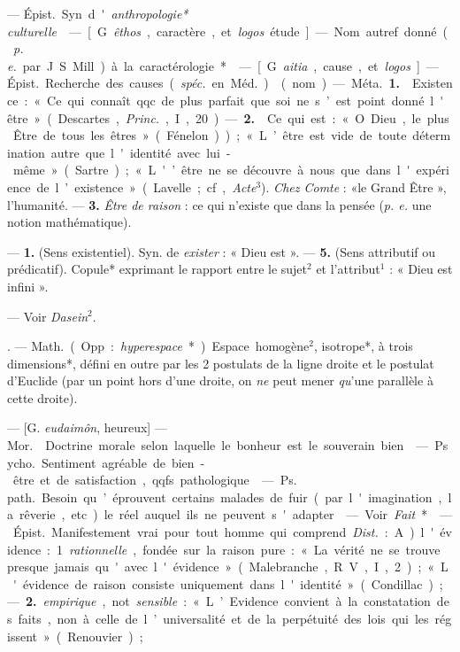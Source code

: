 \begin{itemize}[leftmargin=1cm, label=, itemsep=1pt]
 — \si{Épist.} Syn. d'{\it anthropologie* culturelle}.

 — [G. {\it êthos}, caractère, et {\it logos}
étude] — Nom autref. donné ({\it p. e.}
par J. S. Mill) à la caractérologie*.

 — [G. {\it aitia}, cause, et {\it logos}] —
\si{Épist.} Recherche des causes ({\it spéc.}
en \si{Méd.}).

 (nom) — \si{Méta.} {\bf 1.}  Existence :
« Ce qui connaît qqc. de plus parfait
que soi ne s’est point donné l'être »
(Descartes, {\it Princ.}, I, 20). — {\bf 2.}  Ce
qui est : « O Dieu, le plus Être de
tous les êtres » (Fénelon)); « L’être
est vide de toute détermination
autre que l'identité avec lui-même »
(Sartre); « L'’être ne se découvre à
nous que dans l'expérience de l’existence »
(Lavelle; cf, {\it Acte}$^3$). {\it Chez
Comte} : «le Grand Être », l'humanité.
— {\bf 3.} {\it Être de raison} : ce qui n'existe
que dans la pensée ({\it p. e.} une notion
mathématique).

 — {\bf 1.} (Sens existentiel).
Syn. de {\it exister} : « Dieu est ». — {\bf 5.}
(Sens attributif ou prédicatif). Copule* exprimant le rapport entre le
sujet$^2$ et l'attribut$^1$ : « Dieu est infini ».

 — Voir {\it Dasein}$^2$.

. — \si{Math.} (Opp. :
{\it hyperespace}*). Espace homogène$^2$,
isotrope*, à trois dimensions*, défini
en outre par les 2 postulats de la
ligne droite et le postulat d'Euclide
(par un point hors d’une droite, on
{\it ne} peut mener {\it qu}'une parallèle à
cette droite).

 — [G. {\it eudaimôn}, heureux] — \si{Mor.} 
Doctrine morale selon laquelle le bonheur est le souverain bien.

 — \si{Psycho.} Sentiment
agréable de bien-être et de satisfaction, qqfs. pathologique.

 — \si{Ps. path.} Besoin qu’éprouvent certains malades de
fuir (par l'imagination, la rêverie, etc.) le
réel auquel ils ne peuvent s'adapter.

 — Voir {\it Fait}*.

 — \si{Épist.} Manifestement vrai pour tout homme qui
comprend. {\it Dist.} : A) l'évidence :
1. {\it rationnelle}, fondée sur la raison
pure : « La vérité ne se trouve
presque jamais qu'avec l'évidence »
(Malebranche, R. V., I, 2); « L'évidence de raison consiste uniquement dans
l'identité » (Condillac) ; — {\bf 2.} {\it empirique}, not. {\it sensible} :
 « L’Evidence convient à la constatation des
faits, non à celle de l’universalité
et de la perpétuité des lois qui les régissent » (Renouvier);


\end{itemize}
